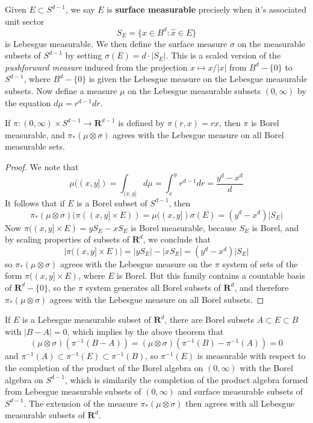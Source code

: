 Given $E \subset S^{d-1}$, we say $E$ is {\bf surface measurable} precisely when it's associated unit sector
%
\[ S_E = \{ x \in B^d: \hat{x} \in E \} \]
%
is Lebesgue measurable. We then define the surface measure $\sigma$ on the measurable subsets of $S^{d-1}$ by setting $\sigma(E) = d \cdot |S_E|$. This is a scaled version of the {\it pushforward measure} induced from the projection $x \mapsto x/|x|$ from $B^d - \{ 0 \}$ to $S^{d-1}$, where $B^d - \{ 0 \}$ is given the Lebesgue measure on the Lebesgue measurable subsets. Now define a measure $\mu$ on the Lebesgue measurable subsets $(0,\infty)$ by the equation $d\mu = r^{d-1} dr$.

\begin{lemma}
    If $\pi: (0,\infty) \times S^{d-1} \to \mathbf{R}^{d-1}$ is defined by $\pi(r,x) = rx$, then $\pi$ is Borel measurable, and $\pi_*(\mu \otimes \sigma)$ agrees with the Lebesgue measure on all Borel measurable sets.
\end{lemma}
\begin{proof}
    We note that
    \[ \mu((x,y]) = \int_{(x,y]} d\mu = \int_x^y r^{d-1} dr = \frac{y^d - x^d}{d} \]
    It follows that if $E$ is a Borel subset of $S^{d-1}$, then
    \[ \pi_*(\mu \otimes \sigma)(\pi((x,y] \times E)) = \mu((x,y]) \sigma(E) = (y^d - x^d) |S_E| \]
    Now $\pi((x,y] \times E) = yS_E - xS_E$ is Borel measurable, because $S_E$ is Borel, and by scaling properties of subsets of $\mathbf{R}^d$, we conclude that
    \[ |\pi((x,y] \times E)| = |yS_E| - |xS_E| = (y^d - x^d)|S_E| \]
    so $\pi_*(\mu \otimes \sigma)$ agrees with the Lebesgue measure on the $\pi$ system of sets of the form $\pi((x,y] \times E)$, where $E$ is Borel. But this family contains a countable basis of $\mathbf{R}^d - \{ 0 \}$, so the $\pi$ system generates all Borel subsets of $\mathbf{R}^d$, and therefore $\pi_*(\mu \otimes \sigma)$ agrees with the Lebesgue measure on all Borel subsets.
\end{proof}

If $E$ is a Lebesgue measurable subset of $\mathbf{R}^d$, there are Borel subsets $A \subset E \subset B$ with $|B - A| = 0$, which implies by the above theorem that
%
\[ (\mu \otimes \sigma)(\pi^{-1}(B - A)) = (\mu \otimes \sigma)(\pi^{-1}(B) - \pi^{-1}(A)) = 0 \]
%
and $\pi^{-1}(A) \subset \pi^{-1}(E) \subset \pi^{-1}(B)$, so $\pi^{-1}(E)$ is measurable with respect to the completion of the product of the Borel algebra on $(0,\infty)$ with the Borel algebra on $S^{d-1}$, which is similarily the completion of the product algebra formed from Lebesgue measurable subsets of $(0,\infty)$ and surface measurable subsets of $S^{d-1}$. The extension of the measure $\pi_*(\mu \otimes \sigma)$ then agrees with all Lebesgue measurable subsets of $\mathbf{R}^d$.

